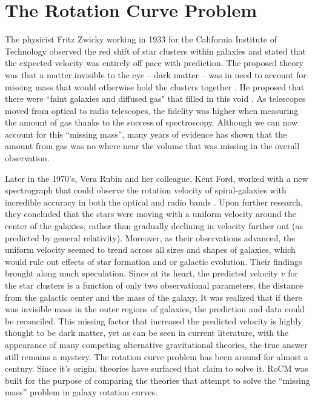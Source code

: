 \documentclass[conference]{IEEEtran-modified}
\begin{document}



\section{The Rotation Curve Problem}

The physicist Fritz Zwicky working in 1933 for the California Institute of Technology observed the red shift of star clusters within galaxies and stated that the expected velocity was entirely off pace with prediction. The proposed theory was that a matter invisible to the eye -- dark matter -- was in need to account for missing mass that would otherwise hold the clusters together \cite{zwicky}. He proposed that there were ``faint galaxies and diffused gas" that filled in this void \cite{zwicky}.  As telescopes moved from optical to radio telescopes, the fidelity was higher when measuring the amount of gas thanks to the success of spectroscopy.  Although we can now account for this ``missing mass'', many years of evidence has shown that the amount from gas was no where near the volume that was missing in the overall observation. 

Later in the 1970's, Vera Rubin and her colleague, Kent Ford, worked with a new spectrograph that could observe the rotation velocity of spiral-galaxies with incredible accuracy in both the optical and radio bands \cite{rubin1980}. Upon further research, they concluded that the stars were moving with a uniform velocity around the center of the galaxies, rather than gradually declining in velocity further out (as predicted by general relativity).  Moreover, as their observations advanced, the uniform velocity seemed to trend across all sizes and shapes of galaxies, which would rule out effects of star formation and or galactic evolution. Their findings brought along much speculation.  Since at its heart, the predicted velocity $v$ for the star clusters is a function of only two observational parameters, the distance from the galactic center and the mass of the galaxy. It was realized that if there was invisible mass in the outer regions of galaxies, the prediction and data could be reconciled. This missing factor that increased the predicted velocity is highly thought to be dark matter, yet as can be seen in current literature, with the appearance of many competing alternative gravitational theories, the true answer still remains a mystery.
The rotation curve problem has been around for almost a century. Since it's origin, theories have surfaced that claim to solve it. RoCM was built for the purpose of comparing the theories that attempt to solve the ``missing mass'' problem in galaxy rotation curves.
\end{document}
